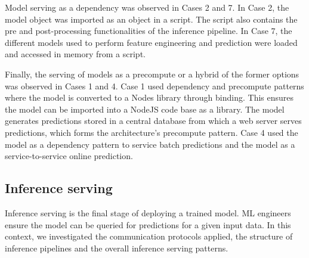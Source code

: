 Model serving as a dependency was observed in Cases 2 and 7. In Case 2, the model object was imported as an object in a script. The script also contains the pre and post-processing functionalities of the inference pipeline. In Case 7, the different models used to perform feature engineering and prediction were loaded and accessed in memory from a script. 

Finally, the serving of models as a precompute or a hybrid of the former options was observed in Cases 1 and 4. Case 1 used dependency and precompute patterns where the model is converted to a  Nodes library through binding. This ensures the model can be imported into a NodeJS code base as a library. The model generates predictions stored in a central database from which a web server serves predictions, which forms the architecture's precompute pattern. Case 4 used the model as a dependency pattern to service batch predictions and the model as a service-to-service online prediction.





\subsection{Inference serving}
Inference serving is the final stage of deploying a trained model. ML engineers ensure the model can be queried for predictions for a given input data. In this context, we investigated the communication protocols applied, the structure of inference pipelines and the overall inference %
serving patterns.


